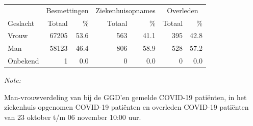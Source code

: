 \documentclass[
  english,
  man,floatsintext]{apa6}
\begin{document}
\begin{table}[H]
\centering\begingroup\fontsize{11}{13}\selectfont

\begin{threeparttable}
\begin{tabular}{lrrrrrr}
\toprule
\multicolumn{1}{c}{ } & \multicolumn{2}{c}{Besmettingen} & \multicolumn{2}{c}{Ziekenhuisopnames} & \multicolumn{2}{c}{Overleden} \\
\cmidrule(l{3pt}r{3pt}){2-3} \cmidrule(l{3pt}r{3pt}){4-5} \cmidrule(l{3pt}r{3pt}){6-7}
Geslacht & Totaal & \% & Totaal & \% & Totaal & \%\\
\midrule
Vrouw & 67205 & 53.6 & 563 & 41.1 & 395 & 42.8\\
Man & 58123 & 46.4 & 806 & 58.9 & 528 & 57.2\\
Onbekend & 1 & 0.0 & 0 & 0.0 & 0 & 0.0\\
\bottomrule
\end{tabular}
\begin{tablenotes}
\item \textit{Note: } 
\item Man-vrouwverdeling van bij de GGD’en gemelde COVID-19 patiënten, in het ziekenhuis opgenomen COVID-19 patiënten en overleden COVID-19 patiënten van 23 oktober t/m 06 november 10:00 uur.
\end{tablenotes}
\end{threeparttable}
\endgroup{}
\end{table}
\newpage
\end{document}
